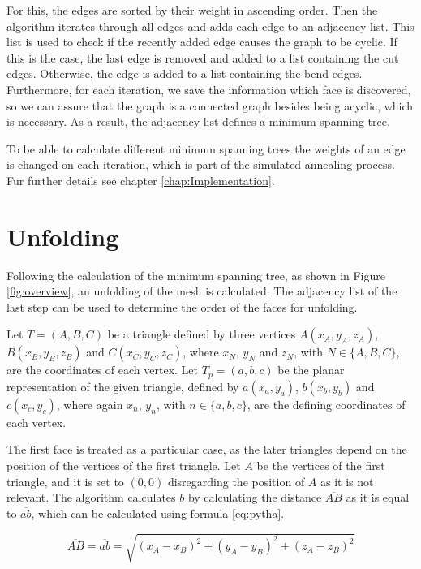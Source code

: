 \documentclass[draft,final]{vutinfth} %
\begin{document}
For this, the edges are sorted by their weight in ascending order. Then the algorithm iterates through all edges and adds each edge to an adjacency list. This list is used to check if the recently added edge causes the graph to be cyclic. If this is the case, the last edge is removed and added to a list containing the cut edges. Otherwise, the edge is added to a list containing the bend edges. Furthermore, for each iteration, we save the information which face is discovered, so we can assure that the graph is a connected graph besides being acyclic, which is necessary. As a result, the adjacency list defines a minimum spanning tree.

To be able to calculate different minimum spanning trees the weights of an edge is changed on each iteration, which is part of the simulated annealing process. Fur further details see chapter \ref{chap:Implementation}.

\section{Unfolding}
\label{sec:unfold}
Following the calculation of the minimum spanning tree, as shown in Figure \ref{fig:overview}, an unfolding of the mesh is calculated. The adjacency list of the last step can be used to determine the order of the faces for unfolding.

Let $T = (A,B,C)$ be a triangle defined by three vertices $A(x_A, y_A, z_A)$, $B(x_B, y_B, z_B)$ and $C(x_C, y_C, z_C)$, where $x_N$, $y_N$ and $z_N$, with $N \in \{A,B,C\}$, are the coordinates of each vertex. Let $T_p = (a, b, c)$ be the planar representation of the given triangle, defined by $a(x_a, y_a)$, $b(x_b, y_b)$ and $c(x_c, y_c)$, where again $x_n$, $y_n$, with $n \in \{a,b,c\}$, are the defining coordinates of each vertex.

The first face is treated as a particular case, as the later triangles depend on the position of the vertices of the first triangle. Let $A$ be the vertices of the first triangle, and it is set to $(0,0)$ disregarding the position of $A$ as it is not relevant. The algorithm calculates $b$ by calculating the distance $\overline{AB}$ as it is equal to $\overline{ab}$, which can be calculated using formula \ref{eq:pytha}.

\begin{equation}
\label{eq:pytha}
\overline{AB} = \overline{ab} = \sqrt{(x_A - x_B)^2 + (y_A - y_B)^2 + (z_A - z_B)^2}
\end{equation}
\end{document}
